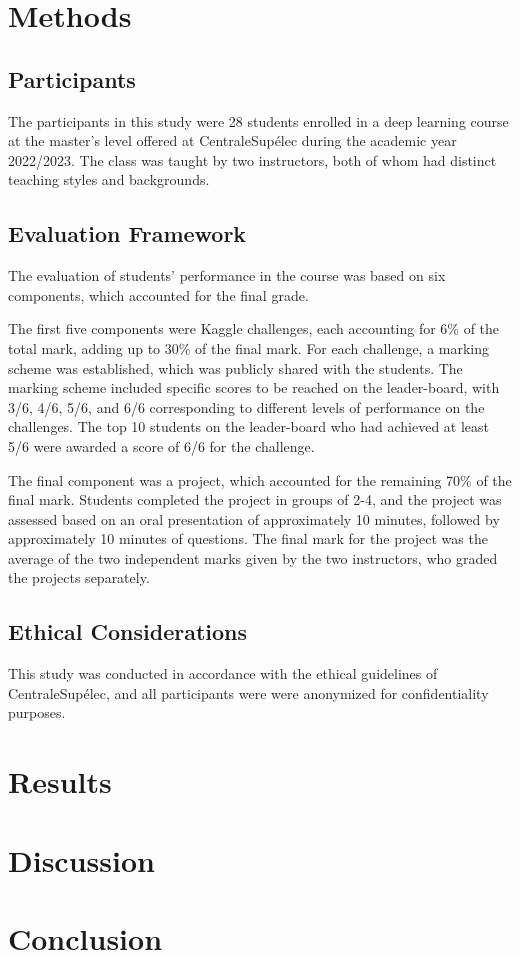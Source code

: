 \documentclass[a4paper]{article}
\begin{document}
\section{Methods}
\subsection{Participants}
The participants in this study were 28 students enrolled in a deep learning course at the master's level offered at CentraleSupélec during the academic year 2022/2023.
The class was taught by two instructors, both of whom had distinct teaching styles and backgrounds.

\subsection{Evaluation Framework}
The evaluation of students' performance in the course was based on six components, which accounted for the final grade.

The first five components were Kaggle challenges, each accounting for 6\% of the total mark, adding up to 30\% of the final mark.
For each challenge, a marking scheme was established, which was publicly shared with the students.
The marking scheme included specific scores to be reached on the leader-board, with 3/6, 4/6, 5/6, and 6/6 corresponding to different levels of performance on the challenges.
The top 10 students on the leader-board who had achieved at least 5/6 were awarded a score of 6/6 for the challenge.

The final component was a project, which accounted for the remaining 70\% of the final mark.
Students completed the project in groups of 2-4, and the project was assessed based on an oral presentation of approximately 10 minutes, followed by approximately 10 minutes of questions.
The final mark for the project was the average of the two independent marks given by the two instructors, who graded the projects separately.

\subsection{Ethical Considerations}
This study was conducted in accordance with the ethical guidelines of CentraleSupélec, and all participants were were anonymized for confidentiality purposes.

\section{Results}
\section{Discussion}
\section{Conclusion}
\end{document}
